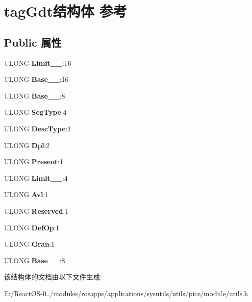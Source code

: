 \hypertarget{structtag_gdt}{}\section{tag\+Gdt结构体 参考}
\label{structtag_gdt}
\subsection*{Public 属性}
\begin{DoxyCompactItemize}
\item 
\mbox{\label{structtag_gdt_a66794a1b06eae2b05c071f619d1ff8aa}} 
U\+L\+O\+NG {\bfseries Limit\+\_\+\_}\+:16
\item 
\mbox{\label{structtag_gdt_ada9766ee1a8fa4ef8be46e63c959d2a1}} 
U\+L\+O\+NG {\bfseries Base\+\_\+\_}\+:16
\item 
\mbox{\label{structtag_gdt_aa39c282f0cdba27f8cc94bb6fbdacdf9}} 
U\+L\+O\+NG {\bfseries Base\+\_\+\_}\+:8
\item 
\mbox{\label{structtag_gdt_ab69fb621c4da319707c8db028dd8c33b}} 
U\+L\+O\+NG {\bfseries Seg\+Type}\+:4
\item 
\mbox{\label{structtag_gdt_aadc78f5cbc0305c68cae49682c1cdfe6}} 
U\+L\+O\+NG {\bfseries Desc\+Type}\+:1
\item 
\mbox{\label{structtag_gdt_ac7f91a4d166b523560ed5bb5fe5dcb8c}} 
U\+L\+O\+NG {\bfseries Dpl}\+:2
\item 
\mbox{\label{structtag_gdt_a63ceb2a38e0f01333f714f05fa1b899d}} 
U\+L\+O\+NG {\bfseries Present}\+:1
\item 
\mbox{\label{structtag_gdt_a892d6cb39fb86917a6d3dd24b386f522}} 
U\+L\+O\+NG {\bfseries Limit\+\_\+\_}\+:4
\item 
\mbox{\label{structtag_gdt_a267967e4e35c10288a52379dadf401f8}} 
U\+L\+O\+NG {\bfseries Avl}\+:1
\item 
\mbox{\label{structtag_gdt_adce43966de92a371d4de66a1d256900f}} 
U\+L\+O\+NG {\bfseries Reserved}\+:1
\item 
\mbox{\label{structtag_gdt_a4236c6a006f3eaa3b042220755d34954}} 
U\+L\+O\+NG {\bfseries Def\+Op}\+:1
\item 
\mbox{\label{structtag_gdt_ac93d746da9869c8dbb4c5c5be43c5b72}} 
U\+L\+O\+NG {\bfseries Gran}\+:1
\item 
\mbox{\label{structtag_gdt_a170dc47a67e1294419bc97fc87f99bd1}} 
U\+L\+O\+NG {\bfseries Base\+\_\+\_}\+:8
\end{DoxyCompactItemize}


该结构体的文档由以下文件生成\+:\begin{DoxyCompactItemize}
\item 
E\+:/\+React\+O\+S-\/0../modules/rosapps/applications/sysutils/utils/pice/module/utils.\+h\end{DoxyCompactItemize}
